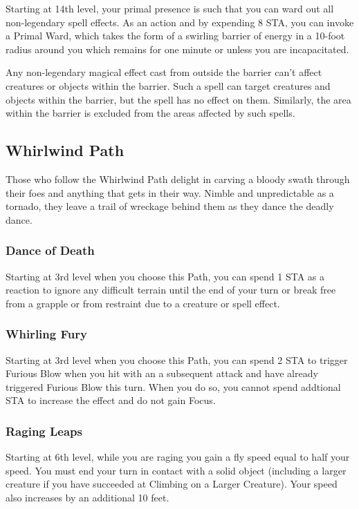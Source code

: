 Starting at 14th level, your primal presence is such that you can ward out all non-legendary spell effects. As an action and by expending 8 STA, you can invoke a Primal Ward, which takes the form of a swirling barrier of energy in a 10-foot radius around you which remains for one minute or unless you are incapacitated.

Any non-legendary magical effect cast from outside the barrier can't affect creatures or objects within the barrier. Such a spell can target creatures and objects within the barrier, but the spell has no effect on them. Similarly, the area within the barrier is excluded from the areas affected by such spells.

\subsection{Whirlwind Path}
Those who follow the Whirlwind Path delight in carving a bloody swath through their foes and anything that gets in their way. Nimble and unpredictable as a tornado, they leave a trail of wreckage behind them as they dance the deadly dance.

\subsubsection{Dance of Death}
Starting at 3rd level when you choose this Path, you can spend 1 STA as a reaction to ignore any difficult terrain until the end of your turn or break free from a grapple or from restraint due to a creature or spell effect.

\subsubsection{Whirling Fury}
Starting at 3rd level when you choose this Path, you can spend 2 STA to trigger Furious Blow when you hit with an a subsequent attack and have already triggered Furious Blow this turn. When you do so, you cannot spend addtional STA to increase the effect and do not gain Focus.

\subsubsection{Raging Leaps}
Starting at 6th level, while you are raging you gain a fly speed equal to half your speed. You must end your turn in contact with a solid object (including a larger creature if you have succeeded at Climbing on a Larger Creature). Your speed also increases by an additional 10 feet.

